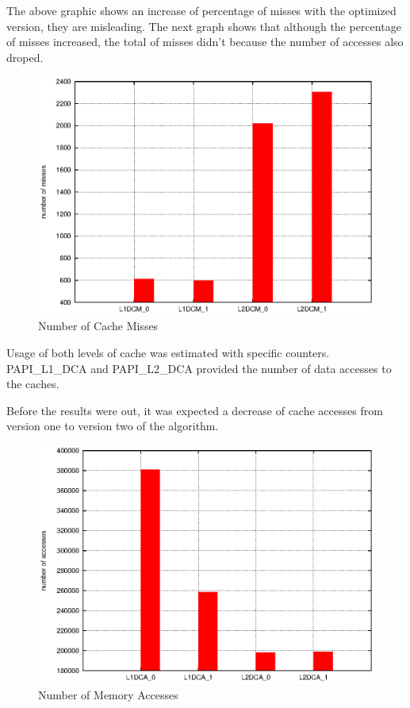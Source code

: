 \documentclass[a4paper,10pt,openright,openbib]{article}
\begin{document}
The above graphic shows an increase of percentage of misses with the optimized version, they are misleading. The next graph shows that although the percentage of misses increased, the total of misses didn't because the number of accesses also droped.

\begin{figure}[!htp]
	\centering
	\begin{minipage}[t]{0.5\linewidth}
		\includegraphics[width=\textwidth]{images/misses.eps}
		\caption{Number of Cache Misses \label{fig:cachel1}}
	\end{minipage}
\end{figure} 

Usage of both levels of cache was estimated with specific counters. PAPI\_L1\_DCA and PAPI\_L2\_DCA provided the number of data accesses to the caches.

Before the results were out, it was expected a decrease of cache accesses from version one to version two of the algorithm.

\begin{figure}[!htp]
	\centering
	\begin{minipage}[t]{0.5\linewidth}
		\includegraphics[width=\textwidth]{images/totals.eps}
		\caption{Number of Memory Accesses \label{fig:cachel1}}
	\end{minipage}
\end{figure}
\end{document}
